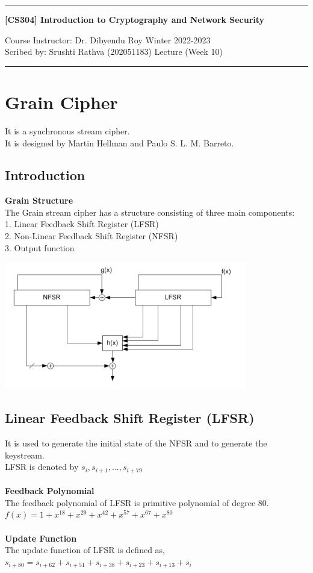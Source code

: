 \documentclass[11pt]{article}
\begin{document}
\noindent
\rule{\textwidth}{1pt}
\begin{center}
{\bf [CS304] Introduction to Cryptography and Network Security}
\end{center}
Course Instructor: Dr. Dibyendu Roy \hfill Winter 2022-2023 \\
Scribed by: Srushti Rathva (202051183) \hfill Lecture (Week 10) \\
\rule{\textwidth}{1pt}

\section*{Grain Cipher}
It is a synchronous stream cipher.\\
It is designed by Martin Hellman and Paulo S. L. M. Barreto.
\subsection*{Introduction}
\textbf{Grain Structure} \\
The Grain stream cipher has a structure consisting of three main components:\\
1. Linear Feedback Shift Register (LFSR) \\
2. Non-Linear Feedback Shift Register (NFSR) \\
3. Output function 
\begin{center}
\includegraphics[width=300pt]{p1.png}
\end{center}
\subsection*{Linear Feedback Shift Register (LFSR)}
It is used to generate the initial state of the NFSR and to generate the keystream.\\
LFSR is denoted by $s_{i},s_{i+1},...,s_{i+79}$ \\\\
\textbf{Feedback Polynomial}\\
The feedback polynomial of LFSR is primitive polynomial of degree 80. \\
$f(x) = 1 + x^{18} + x^{29} + x^{42} + x^{57} + x^{67} + x^{80}$ \\\\
\textbf{Update Function}\\
The update function of LFSR is defined as,\\
$s_{i+80} = s_{i+62} + s_{i+51} + s_{i+38} + s_{i+23} + s_{i+13} + s_{i}$ 
\end{document}
